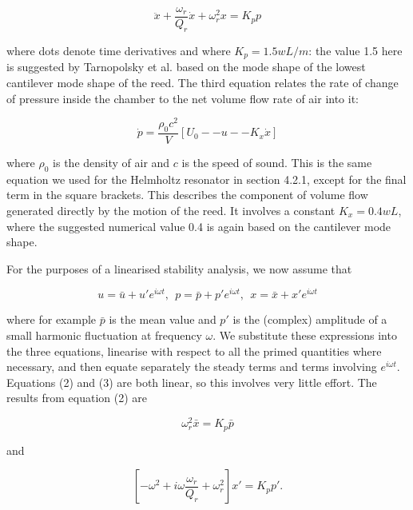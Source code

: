   \begin{equation*}\ddot{x}+\dfrac{\omega_r}{Q_r}\dot{x}+\omega_r^2 x = K_p p 
  \tag{2}\end{equation*} 

  \noindent{}where dots denote time derivatives and where $K_p =1.5 w L/m$: the 
  value 1.5 here is suggested by Tarnopolsky et al. based on the mode shape of 
  the lowest cantilever mode shape of the reed. The third equation relates the 
  rate of change of pressure inside the chamber to the net volume flow rate of 
  air into it: 

  \begin{equation*}\dot{p}=\dfrac{\rho_0 c^2}{V}[U_0 -- u -- K_x \dot{x}] 
  \tag{3}\end{equation*} 

  \noindent{}where $\rho_0$ is the density of air and $c$ is the speed of 
  sound. This is the same equation we used for the Helmholtz resonator in 
  section 4.2.1, except for the final term in the square brackets. This 
  describes the component of volume flow generated directly by the motion of 
  the reed. It involves a constant $K_x=0.4wL$, where the suggested numerical 
  value 0.4 is again based on the cantilever mode shape. 

  For the purposes of a linearised stability analysis, we now assume that 

  \begin{equation*}u=\bar{u}+u' e^{i \omega t} \mathrm{,~~} p=\bar{p}+p' e^{i 
  \omega t} \mathrm{,~~} x=\bar{x}+x' e^{i \omega t} \tag{4}\end{equation*} 

  \noindent{}where for example $\bar{p}$ is the mean value and $p'$ is the 
  (complex) amplitude of a small harmonic fluctuation at frequency $\omega$. We 
  substitute these expressions into the three equations, linearise with respect 
  to all the primed quantities where necessary, and then equate separately the 
  steady terms and terms involving $e^{i \omega t}$. Equations (2) and (3) are 
  both linear, so this involves very little effort. The results from equation 
  (2) are 

  \begin{equation*}\omega_r^2 \bar{x}=K_p \bar{p} \tag{5}\end{equation*} 

  \noindent{}and 

  \begin{equation*}\left[ -\omega^2 + i \omega \dfrac{\omega_r}{Q_r} + 
  \omega_r^2 \right]x' = K_p p' . \tag{6}\end{equation*} 

